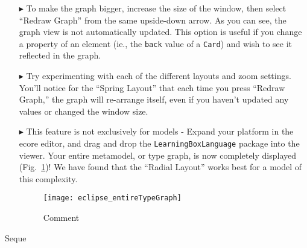 \begin{itemize}
\item[$\blacktriangleright$] To make the graph bigger, increase the size of the window, then select ``Redraw Graph'' from the same upside-down arrow. As you can
see, the graph view is not automatically updated. This option is useful if you change a property of an element (ie., the \texttt{back} value of a \texttt{Card})
and wish to see it reflected in the graph.

\item[$\blacktriangleright$] Try experimenting with each of the different layouts and zoom settings. You'll notice for the ``Spring Layout'' that each time you
press ``Redraw Graph,'' the graph will re-arrange itself, even if you haven't updated any values or changed the window size.

\item[$\blacktriangleright$] This feature is not exclusively for models - Expand your platform in the ecore editor, and drag and drop the
\texttt{LearningBoxLanguage} package into the viewer. Your entire metamodel, or type graph, is now completely displayed (Fig.~\ref{fig:graphView_typeGraph})! We
have found that the ``Radial Layout'' works best for a model of this complexity.

\begin{figure}[htbp]
	\centering
  \texttt{[image: eclipse\_entireTypeGraph]}
	\caption{Comment}
	\label{fig:graphView_typeGraph}
\end{figure}

\end{itemize}

Seque
